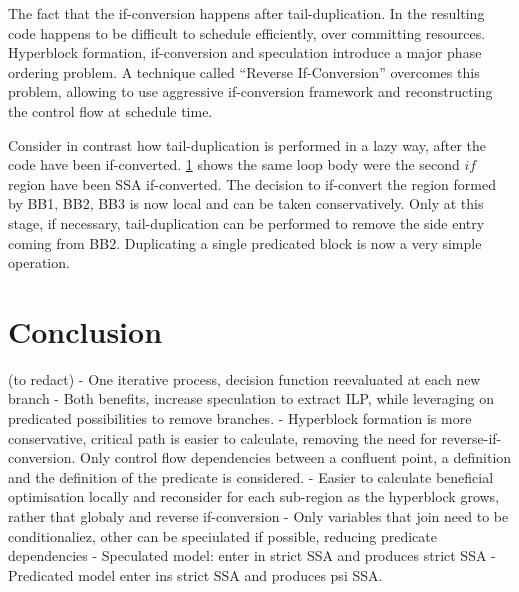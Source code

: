 \begin{figure}[h]
{    \label{fig:hyper4}}
\end{figure}

The fact that the if-conversion happens after tail-duplication. In the resulting code happens to be difficult to schedule efficiently, over committing resources. Hyperblock formation, if-conversion and speculation introduce a major phase ordering problem. A technique called ``Reverse If-Conversion'' \cite{August:1999:PRI:326224.325595} overcomes this problem, allowing to use aggressive if-conversion framework and reconstructing the control flow at schedule time.

Consider in contrast how tail-duplication is performed in a lazy way, after the code have been if-converted. \ref{fig:hyper4} shows the same loop body were the second $if$ region have been SSA if-converted. The decision to if-convert the region formed by {BB1, BB2, BB3} is now local and can be taken conservatively. Only at this stage, if necessary, tail-duplication can be performed to remove the side entry coming from BB2. Duplicating a single predicated block is now a very simple operation.

\section{Conclusion} (to redact)
- One iterative process, decision function reevaluated at each new branch
- Both benefits, increase speculation to extract ILP, while leveraging on predicated possibilities to remove branches.
- Hyperblock formation is more conservative, critical path is easier to calculate, removing the need for reverse-if-conversion. Only control flow dependencies between a confluent point, a definition and the definition of the predicate is considered. 
- Easier to calculate beneficial optimisation locally and reconsider for each sub-region as the hyperblock grows, rather that globaly and reverse if-conversion
- Only variables that join need to be conditionaliez, other can be speciulated if possible, reducing predicate dependencies
- Speculated model: enter in strict SSA and produces strict SSA
- Predicated model enter ins strict SSA and produces psi SSA.




